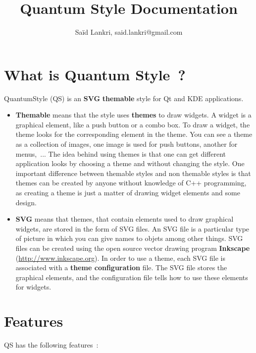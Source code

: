 \documentclass[a4paper,12pt]{report}
\title{\textbf{Quantum Style Documentation}}
\author{Saïd Lankri, said.lankri@gmail.com}
\begin{document}
\maketitle

\section{What is Quantum Style~?}
QuantumStyle (QS) is an \textbf{SVG} \textbf{themable} style for Qt and KDE
applications.\\

\begin{itemize}
  \item \textbf{Themable} means that the style uses \textbf{themes} to draw
widgets. A widget is a graphical element, like a push button or a combo box. To
draw a widget, the theme looks for the corresponding element in the theme.
You can see a theme as a collection of images, one image is used for push
buttons, another for menus,~... The idea behind using themes is that one can
get different application looks by choosing a theme and without changing the
style. One important difference between themable styles and non themable
styles is that themes can be created by anyone without knowledge of C++
programming, as creating a theme is just a matter of drawing widget elements
and some design.\\

  \item\textbf{SVG} means that themes, that contain elements used to draw
graphical widgets, are stored in the form of SVG files. An SVG file is a
particular type of picture in which you can give names to objets among other
things. SVG files can be created using the open source vector drawing program
\textbf{Inkscape} (\url{http://www.inkscape.org}). In order to use a theme,
each SVG file is associated with a \textbf{theme configuration} file. The SVG
file stores the graphical elements, and the configuration file tells how to use
these elements for widgets.
\end{itemize}

\section{Features}
QS has the following features~:
\end{document}
